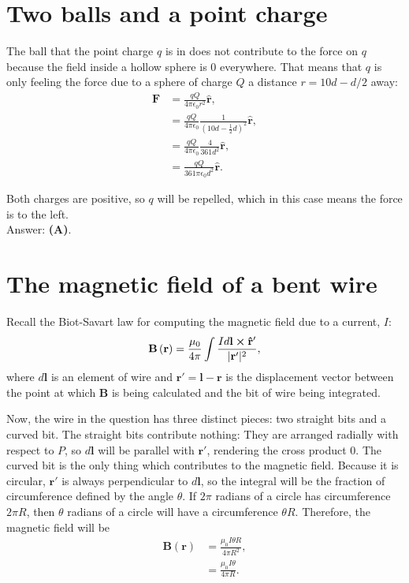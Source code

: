 \documentclass[11pt]{paper}
\newcommand{\answer}[1]{Answer: \textbf{(#1)}.}
\begin{document}
\section{Two balls and a point charge}
The ball that the point charge $q$ is in does not contribute to the force on $q$ because the field inside a hollow sphere is 0 everywhere.  That means that $q$ is only feeling the force due to a sphere of charge $Q$ a distance $r = 10d - d/2$ away:
\begin{align}
	\mathbf{F} &= \frac{qQ}{4\pi \epsilon_0 r^2}\mathbf{\hat{r}},\\
	&= \frac{qQ}{4\pi \epsilon_0}\frac{1}{\left(10d-\frac{1}{2}d\right)^2}\mathbf{\hat{r}},\\
	&= \frac{qQ}{4\pi \epsilon_0}\frac{4}{361d^2}\mathbf{\hat{r}},\\
	&= \frac{qQ}{361\pi\epsilon_0d^2}\mathbf{\hat{r}}.
\end{align}

Both charges are positive, so $q$ will be repelled, which in this case means the force is to the left.\\

\answer{A}

\section{The magnetic field of a bent wire}
Recall the Biot-Savart law for computing the magnetic field due to a current, $I$:
\begin{equation}
	\mathbf{B}\left(\mathbf{r}\right) = \frac{\mu_0}{4\pi} \int \frac{Id\mathbf{l}\cross\mathbf{\hat{r}'}}{|\mathbf{r'}|^2},
\end{equation}
where $d\mathbf{l}$ is an element of wire and $\mathbf{r'}=\mathbf{l}-\mathbf{r}$ is the displacement vector between the point at which $\mathbf{B}$ is being calculated and the bit of wire being integrated.

Now, the wire in the question has three distinct pieces: two straight bits and a curved bit.  The straight bits contribute nothing: They are arranged radially with respect to $P$, so $d\mathbf{l}$ will be parallel with $\mathbf{r}'$, rendering the cross product 0.  The curved bit is the only thing which contributes to the magnetic field.  Because it is circular, $\mathbf{r}'$ is always perpendicular to $d\mathbf{l}$, so the integral will be the fraction of circumference defined by the angle $\theta$.  If $2\pi$ radians of a circle has circumference $2\pi R$, then $\theta$ radians of a circle will have a circumference $\theta R$.  Therefore, the magnetic field will be
\begin{align}
	\mathbf{B}\left(\mathbf{r}\right) &= \frac{\mu_0 I \theta R}{4\pi R^2},\\
	&= \frac{\mu_0 I \theta}{4\pi R}.
\end{align}
\end{document}
